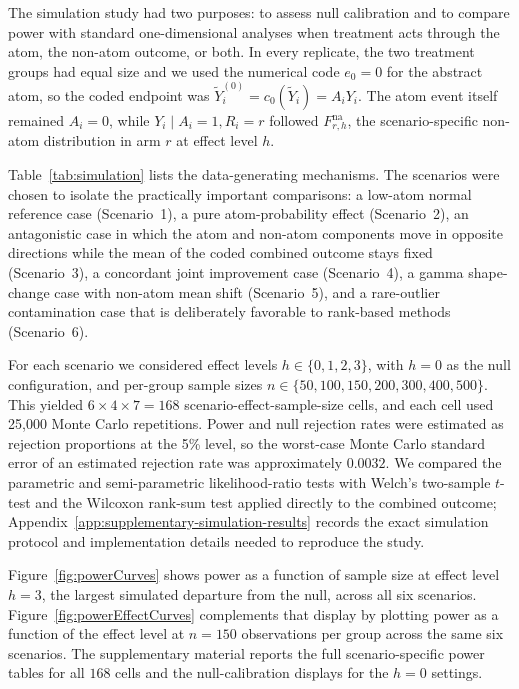 \documentclass[11pt]{article}
\begin{document}
The simulation study had two purposes: to assess null calibration and to compare power with standard one-dimensional analyses when treatment acts through the atom, the non-atom outcome, or both. In every replicate, the two treatment groups had equal size and we used the numerical code $e_0=0$ for the abstract atom, so the coded endpoint was $\widetilde{Y}_i^{(0)}=c_0(\widetilde{Y}_i)=A_iY_i$. The atom event itself remained $A_i=0$, while $Y_i\mid A_i=1,R_i=r$ followed $F_{r,h}^{\mathrm{na}}$, the scenario-specific non-atom distribution in arm $r$ at effect level $h$.

Table~\ref{tab:simulation} lists the data-generating mechanisms. The scenarios were chosen to isolate the practically important comparisons: a low-atom normal reference case (Scenario~1), a pure atom-probability effect (Scenario~2), an antagonistic case in which the atom and non-atom components move in opposite directions while the mean of the coded combined outcome stays fixed (Scenario~3), a concordant joint improvement case (Scenario~4), a gamma shape-change case with non-atom mean shift (Scenario~5), and a rare-outlier contamination case that is deliberately favorable to rank-based methods (Scenario~6).



For each scenario we considered effect levels $h \in \{0, 1, 2, 3\}$, with $h = 0$ as the null configuration, and per-group sample sizes $n \in \{50,100,150,200,300,400,500\}$. This yielded $6 \times 4 \times 7 = 168$ scenario-effect-sample-size cells, and each cell used 25,000 Monte Carlo repetitions. Power and null rejection rates were estimated as rejection proportions at the 5\% level, so the worst-case Monte Carlo standard error of an estimated rejection rate was approximately $0.0032$. We compared the parametric and semi-parametric likelihood-ratio tests with Welch's two-sample $t$-test and the Wilcoxon rank-sum test applied directly to the combined outcome; Appendix~\ref{app:supplementary-simulation-results} records the exact simulation protocol and implementation details needed to reproduce the study.

Figure~\ref{fig:powerCurves} shows power as a function of sample size at effect level $h=3$, the largest simulated departure from the null, across all six scenarios. Figure~\ref{fig:powerEffectCurves} complements that display by plotting power as a function of the effect level at $n = 150$ observations per group across the same six scenarios. The supplementary material reports the full scenario-specific power tables for all $168$ cells and the null-calibration displays for the $h = 0$ settings.
\end{document}
